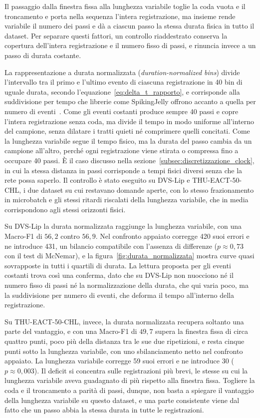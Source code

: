 Il passaggio dalla finestra fissa alla lunghezza variabile toglie la coda vuota e il troncamento e porta nella sequenza l'intera registrazione, ma insieme rende variabile il numero dei passi e dà a ciascun passo la stessa durata fisica in tutto il dataset. Per separare questi fattori, un controllo riaddestrato conserva la copertura dell'intera registrazione e il numero fisso di passi, e rinuncia invece a un passo di durata costante.

\label{subsec:durata_normalizzata}
La rappresentazione a durata normalizzata (\emph{duration-normalized bins}) divide l'intervallo tra il primo e l'ultimo evento di ciascuna registrazione in 40 bin di uguale durata, secondo l'equazione~\eqref{eq:delta_t_rapporto}, e corrisponde alla suddivisione per tempo che librerie come SpikingJelly offrono accanto a quella per numero di eventi~\cite{fang2023spikingjelly}. Come gli eventi costanti produce sempre 40 passi e copre l'intera registrazione senza coda, ma divide il tempo in modo uniforme all'interno del campione, senza dilatare i tratti quieti né comprimere quelli concitati. Come la lunghezza variabile segue il tempo fisico, ma la durata del passo cambia da un campione all'altro, perché ogni registrazione viene stirata o compressa fino a occupare 40 passi. È il caso discusso nella sezione~\ref{subsec:discretizzazione_clock}, in cui la stessa distanza in passi corrisponde a tempi fisici diversi senza che la rete possa saperlo. Il controllo è stato eseguito su DVS-Lip e THU-EACT-50-CHL, i due dataset su cui restavano domande aperte, con lo stesso frazionamento in microbatch e gli stessi ritardi riscalati della lunghezza variabile, che in media corrispondono agli stessi orizzonti fisici.

Su DVS-Lip la durata normalizzata raggiunge la lunghezza variabile, con una Macro-F1 di $56{,}2$ contro $56{,}9$. Nel confronto appaiato corregge 420 suoi errori e ne introduce 431, un bilancio compatibile con l'assenza di differenze ($p\approx0{,}73$ con il test di McNemar), e la figura~\ref{fig:durata_normalizzata} mostra curve quasi sovrapposte in tutti i quartili di durata. La lettura proposta per gli eventi costanti trova così una conferma, dato che su DVS-Lip non nuocciono né il numero fisso di passi né la normalizzazione della durata, che qui varia poco, ma la suddivisione per numero di eventi, che deforma il tempo all'interno della registrazione.

Su THU-EACT-50-CHL, invece, la durata normalizzata recupera soltanto una parte del vantaggio, e con una Macro-F1 di $49{,}7$ supera la finestra fissa di circa quattro punti, poco più della distanza tra le sue due ripetizioni, e resta cinque punti sotto la lunghezza variabile, con uno sbilanciamento netto nel confronto appaiato. La lunghezza variabile corregge 59 suoi errori e ne introduce 30 ($p\approx0{,}003$). Il deficit si concentra sulle registrazioni più brevi, le stesse su cui la lunghezza variabile aveva guadagnato di più rispetto alla finestra fissa. Togliere la coda e il troncamento a parità di passi, dunque, non basta a spiegare il vantaggio della lunghezza variabile su questo dataset, e una parte consistente viene dal fatto che un passo abbia la stessa durata in tutte le registrazioni.

